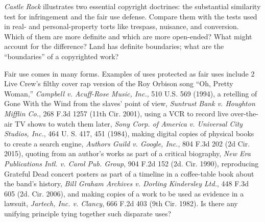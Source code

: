 
\item \textit{Castle Rock} illustrates two essential copyright doctrines: the
substantial similarity test for infringement  and the fair use defense. Compare
them with the tests used in real- and personal-property torts like trespass,
nuisance, and conversion. Which of them are more definite and which are more
open-ended? What might account for the difference? Land has definite
boundaries; what are the ``boundaries'' of a copyrighted work?

\item Fair use comes in many forms. Examples of uses protected as fair uses
include 2 Live Crew's filthy cover rap version of the Roy Orbison song ``Oh,
Pretty Woman,'' \emph{Campbell v. Acuff-Rose Music, Inc.}, 510 U.S. 569 (1994),
a
retelling of Gone With the Wind from the slaves' point of view, \emph{Suntrust Bank
v. Houghton Mifflin Co.}, 268 F.3d 1257 (11th Cir. 2001), using a VCR to record
live over-the-air TV shows to watch them later, \emph{Sony Corp. of America v.
Universal City Studios, Inc.}, 464 U. S. 417, 451 (1984), making digital copies
of physical books to create a search engine, \emph{Authors Guild v. Google, Inc.}, 804
F.3d 202 (2d Cir. 2015), quoting from an author's works as part of a critical
biography, \emph{New Era Publications Intl. v. Carol Pub. Group}, 904 F.2d 152 (2d.
Cir. 1990), reproducing Grateful Dead concert posters as part of a timeline in
a coffee-table book about the band's history, \emph{Bill Graham Archives v. Dorling
Kindersley Ltd.}, 448 F.3d 605 (2d. Cir. 2006), and making copies of a work to
be used as evidence in a lawsuit, \emph{Jartech, Inc. v. Clancy}, 666 F.2d 403 (9th
Cir. 1982). Is there any unifying principle tying together such disparate uses?

